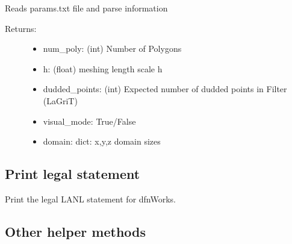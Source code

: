 \documentclass[letterpaper,10pt,english]{sphinxmanual}
\begin{document}
\begin{fulllineitems}
\label{pydfnworks:pydfnworks.mesh_dfn_helper.parse_params_file}
Reads params.txt file and parse information
\begin{description}
\item[{Returns:}] \leavevmode\begin{itemize}
\item {} 
num\_poly: (int) Number of Polygons

\item {} 
h: (float) meshing length scale h

\item {} 
dudded\_points: (int) Expected number of dudded points in Filter (LaGriT)

\item {} 
visual\_mode: True/False

\item {} 
domain: dict: x,y,z domain sizes

\end{itemize}

\end{description}

\end{fulllineitems}



\subsection{Print legal statement}
\label{pydfnworks:print-legal-statement}\label{pydfnworks:module-pydfnworks.legal}

\begin{fulllineitems}
\label{pydfnworks:pydfnworks.legal.legal}
Print the legal LANL statement for dfnWorks.

\end{fulllineitems}



\subsection{Other helper methods}
\label{pydfnworks:module-pydfnworks.helper}\label{pydfnworks:other-helper-methods}
\end{document}
